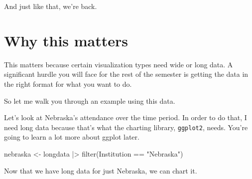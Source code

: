 \documentclass[
  letterpaper,
  DIV=11,
  numbers=noendperiod]{scrreprt}
\newenvironment{Shaded}{\begin{snugshade}}{\end{snugshade}}
\newcommand{\FunctionTok}[1]{\textcolor[rgb]{0.28,0.35,0.67}{#1}}
\newcommand{\NormalTok}[1]{\textcolor[rgb]{0.00,0.23,0.31}{#1}}
\newcommand{\OtherTok}[1]{\textcolor[rgb]{0.00,0.23,0.31}{#1}}
\newcommand{\SpecialCharTok}[1]{\textcolor[rgb]{0.37,0.37,0.37}{#1}}
\newcommand{\StringTok}[1]{\textcolor[rgb]{0.13,0.47,0.30}{#1}}
\begin{document}
And just like that, we're back.

\hypertarget{why-this-matters}{%
\section{Why this matters}\label{why-this-matters}}

This matters because certain visualization types need wide or long data.
A significant hurdle you will face for the rest of the semester is
getting the data in the right format for what you want to do.

So let me walk you through an example using this data.

Let's look at Nebraska's attendance over the time period. In order to do
that, I need long data because that's what the charting library,
\texttt{ggplot2}, needs. You're going to learn a lot more about ggplot
later.

\begin{Shaded}
\begin{Highlighting}[]
\NormalTok{nebraska }\OtherTok{\textless{}{-}}\NormalTok{ longdata }\SpecialCharTok{|\textgreater{}} \FunctionTok{filter}\NormalTok{(Institution }\SpecialCharTok{==} \StringTok{"Nebraska"}\NormalTok{)}
\end{Highlighting}
\end{Shaded}

Now that we have long data for just Nebraska, we can chart it.
\end{document}
